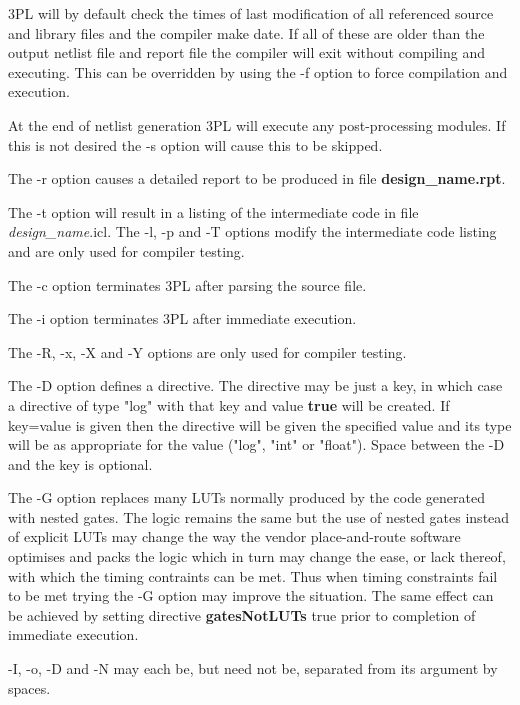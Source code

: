         3PL will by default check the times of last modification of all referenced
        source and library files and the compiler make date. If all of these are older
        than the output netlist file and report file the compiler will exit without
        compiling and executing. This can be overridden by using the -f option to
        force compilation and execution.
        
        At the end of netlist generation 3PL will execute any post-processing
        modules. If this is not desired the -s option will cause this to
        be skipped.
        
        The -r option causes a detailed report to be produced in file {\bf
        design\_name.rpt}.
        
        The -t option will result in a listing of the intermediate code in file
        {\em design\_name}.icl. The -l, -p and -T options modify the
        intermediate code listing and are only used for compiler testing.
        
        The -c option terminates 3PL after parsing the source file.
        
        The -i option terminates 3PL after immediate execution.
        
        The -R, -x, -X and -Y options are only used for compiler testing.
        
        The -D option defines a directive. The directive may be just a
        key, in which case a directive of type "log" with that key and value
        {\bf true} will be created. If key=value is given then the directive
        will be given the specified value and its type will be as appropriate
        for the value ("log", "int" or "float"). Space between the -D and the
        key is optional.
        
        The -G option replaces many LUTs normally produced by the code generated
        with nested gates. The logic remains the same but the use of nested
        gates instead of explicit LUTs may change the way the vendor
        place-and-route software optimises and packs the logic which in turn may
        change the ease, or lack thereof, with which the timing contraints can
        be met. Thus when timing constraints fail to be met trying the -G option
        may improve the situation. The same effect can be achieved by setting
        directive {\bf gatesNotLUTs} true prior to completion of immediate
        execution.

        -I, -o, -D and -N may each be, but need not be, separated from its
        argument by spaces.
        
